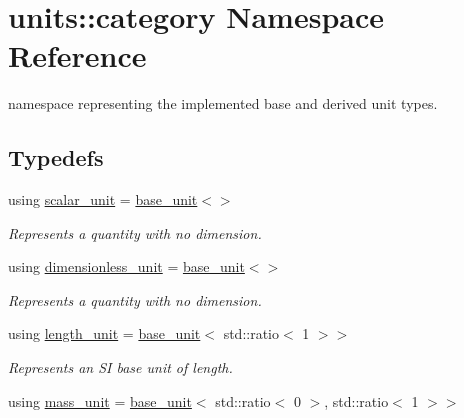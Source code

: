 \hypertarget{namespaceunits_1_1category}{}\section{units\+:\+:category Namespace Reference}
\label{namespaceunits_1_1category}


namespace representing the implemented base and derived unit types.  


\subsection*{Typedefs}
\begin{DoxyCompactItemize}
\item 
\hypertarget{namespaceunits_1_1category_ad633be0ea9f0ebaefb2a648244a5d816}{}using \hyperlink{namespaceunits_1_1category_ad633be0ea9f0ebaefb2a648244a5d816}{scalar\+\_\+unit} = \hyperlink{structunits_1_1base__unit}{base\+\_\+unit}$<$$>$\label{namespaceunits_1_1category_ad633be0ea9f0ebaefb2a648244a5d816}

\begin{DoxyCompactList}\small\item\em Represents a quantity with no dimension. \end{DoxyCompactList}\item 
\hypertarget{namespaceunits_1_1category_a70d9cdc2326b265921b36493485b1254}{}using \hyperlink{namespaceunits_1_1category_a70d9cdc2326b265921b36493485b1254}{dimensionless\+\_\+unit} = \hyperlink{structunits_1_1base__unit}{base\+\_\+unit}$<$$>$\label{namespaceunits_1_1category_a70d9cdc2326b265921b36493485b1254}

\begin{DoxyCompactList}\small\item\em Represents a quantity with no dimension. \end{DoxyCompactList}\item 
\hypertarget{namespaceunits_1_1category_a1140509fa711ad6ae98a4c001d99cfe5}{}using \hyperlink{namespaceunits_1_1category_a1140509fa711ad6ae98a4c001d99cfe5}{length\+\_\+unit} = \hyperlink{structunits_1_1base__unit}{base\+\_\+unit}$<$ std\+::ratio$<$ 1 $>$$>$\label{namespaceunits_1_1category_a1140509fa711ad6ae98a4c001d99cfe5}

\begin{DoxyCompactList}\small\item\em Represents an S\+I base unit of length. \end{DoxyCompactList}\item 
\hypertarget{namespaceunits_1_1category_a2a957f5535dc0cbe3d3fb3f31e5f0d21}{}using \hyperlink{namespaceunits_1_1category_a2a957f5535dc0cbe3d3fb3f31e5f0d21}{mass\+\_\+unit} = \hyperlink{structunits_1_1base__unit}{base\+\_\+unit}$<$ std\+::ratio$<$ 0 $>$, std\+::ratio$<$ 1 $>$$>$\label{namespaceunits_1_1category_a2a957f5535dc0cbe3d3fb3f31e5f0d21}


\end{DoxyCompactItemize}
